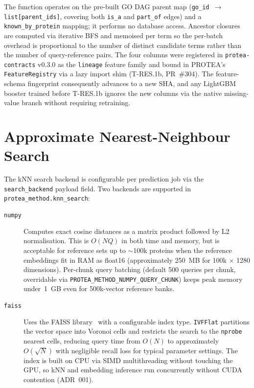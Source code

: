 The function operates on the pre-built GO DAG parent map
(\texttt{go\_id $\to$ list[parent\_ids]}, covering both \texttt{is\_a} and
\texttt{part\_of} edges) and a \texttt{known\_by\_protein} mapping; it
performs no database access. Ancestor closures are computed via iterative
BFS and memoised per term so the per-batch overhead is proportional to the
number of distinct candidate terms rather than the number of
query-reference pairs. The four columns were registered in
\texttt{protea-contracts} v0.3.0 as the \texttt{lineage} feature family
and bound in PROTEA's \texttt{FeatureRegistry} via a lazy import shim
(T-RES.1b, PR~\#304). The feature-schema fingerprint consequently advances
to a new SHA, and any LightGBM booster trained before T-RES.1b ignores the
new columns via the native missing-value branch without requiring retraining.

\section{Approximate Nearest-Neighbour Search}
\label{sec:ann-search}

The kNN search backend is configurable per prediction job via the
\texttt{search\_backend} payload field. Two backends are supported in
\texttt{protea\_method.knn\_search}:

\begin{description}
  \item[\texttt{numpy}] Computes exact cosine distances as a matrix product
    followed by L2 normalisation. This is $O(NQ)$ in both time and memory, but
    is acceptable for reference sets up to $\sim$100k proteins when the reference
    embeddings fit in RAM as float16 (approximately 250~MB for 100k $\times$ 1280
    dimensions). Per-chunk query batching (default 500 queries per chunk,
    overridable via \texttt{PROTEA\_METHOD\_NUMPY\_QUERY\_CHUNK}) keeps peak
    memory under~1~GB even for 500k-vector reference banks.
  \item[\texttt{faiss}] Uses the FAISS library~\cite{johnson2021faiss} with a
    configurable index type. \texttt{IVFFlat} partitions the vector space into
    Voronoi cells and restricts the search to the \texttt{nprobe} nearest cells,
    reducing query time from $O(N)$ to approximately $O(\sqrt{N})$ with
    negligible recall loss for typical parameter settings. The index is built
    on CPU via SIMD multithreading without touching the GPU, so kNN and
    embedding inference run concurrently without CUDA contention (ADR~001).
\end{description}

